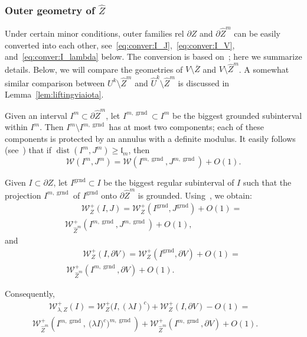 \documentclass{amsart}
\newcommand{\1}{{\mathbb 1 }}
\newcommand{\Width}{{\mathcal W}}
\newcommand{\wZ}{{\widehat Z}}
\newcommand{\length}{{\mathfrak l}}
\newcommand{\grnd}{{\operatorname{grnd}}}
\theoremstyle{remark}
\numberwithin{equation}{section}
\theoremstyle{definition}
\newcommand{\dist}{\operatorname{dist}}
\begin{document}
\subsubsection{Outer geometry of $\wZ$}\label{sss:Outer:wZ}
Under certain minor conditions, outer families rel $\partial Z$ and $\partial \wZ^m$ can be easily converted into each other, see~\eqref{eq:conver:I_J},~\eqref{eq:conver:I_V}, and~\eqref{eq:conver:I_lambda} below. The conversion is based on~\cite[\S5.2]{DL22}; here we summarize details. Below, we will compare the geometries of $V\setminus \overline Z$ and $V\setminus \wZ^m$. A somewhat similar comparison between $U^k\setminus \wZ^m$ and $\widehat U^k\setminus \wZ^m$ is discussed in Lemma~\ref{lem:liftingviaiota}.





Given an interval $I^m\subset \partial \wZ^m$, let $I^{m,\grnd}\subset I^m$ be the biggest grounded subinterval within $I^m$. Then $I^m\setminus I^{m,\grnd}$ has at most two components; each of these components is protected by an annulus with a definite modulus. It easily follows (see~\cite[Lemma 5.18]{DL22}) that if $\dist(I^m,J^m)\ge \length_m$, then
\[\Width(I^m,J^m)=\Width(I^{m,\grnd},J^{m,\grnd})+O(1).\]


Given $I\subset \partial Z$, let $I^\grnd\subset I$ be the biggest regular subinterval of $I$ such that the projection $I^{m,\grnd}$ of $I^\grnd$ onto $\partial \wZ^m$ is grounded. Using~\cite[Lemma 5.10]{DL22}, we obtain:
\begin{multline}
\label{eq:conver:I_J}
  \qquad  \Width^+_{Z}(I,J) =\Width^+_{Z}(I^{\grnd},J^\grnd)+O(1)=\\ \Width^+_{\wZ^m}(I^{m,\grnd},J^{m,\grnd})+O(1), \qquad
\end{multline}
and 
\begin{multline}\label{eq:conver:I_V}
  \qquad  \Width^+_{Z}(I,\partial V) =\Width^+_{Z}(I^{\grnd},\partial V)+O(1)=\\ \Width^+_{\wZ^m}(I^{m,\grnd},\partial V)+O(1). \qquad
\end{multline}


Consequently, 
\begin{multline}\label{eq:conver:I_lambda}
  \qquad  \Width^+_{\lambda, Z}(I) =\Width^+_{Z}\big(I, (\lambda I)^c\big)+\Width^+_{Z}(I,\partial V)-O(1)= \\ \Width^+_{\wZ^m}\left(I^{m,\grnd},\ \Big(\lambda I)^c\Big)^{m,\grnd}\right)+\Width^+_{\wZ^m}(I^{m,\grnd},\partial V)+O(1). \qquad
\end{multline}
\end{document}
